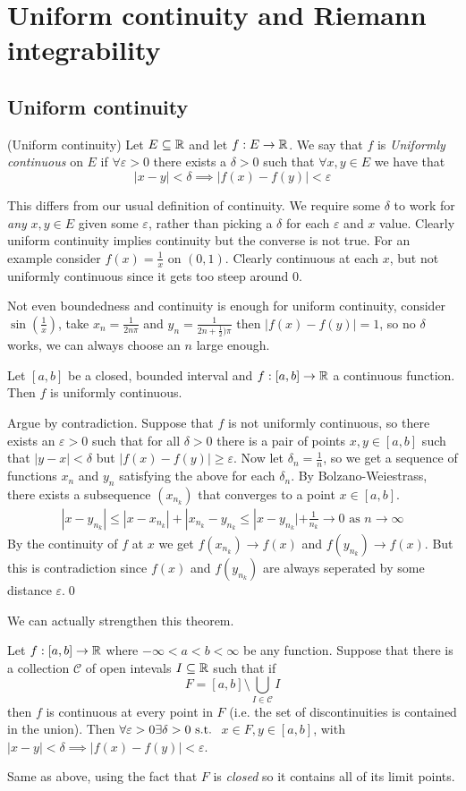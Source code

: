 \documentclass{article}
\newcommand{\eps}{\varepsilon}
\begin{document}
\section{Uniform continuity and Riemann integrability}
\subsection{Uniform continuity}
\begin{definition}
	(Uniform continuity) Let $ E\subseteq \mathbb{R} $ and let $ f:E\to \mathbb{R} $. We say that $ f $ is \textit{Uniformly continuous} on $ E $ if $ \forall \eps>0 $ there exists a $ \delta>0 $ such that $ \forall x,y\in E $ we have that
	\[
	  |x-y|<\delta\implies |f(x)-f(y)|<\eps
	\]
\end{definition}
This differs from our usual definition of continuity. We require some $ \delta $ to work for \textit{any} $ x,y\in E $ given some $ \eps $, rather than picking a $ \delta $ for each $ \eps $ and $ x $ value. Clearly uniform continuity implies continuity but the converse is not true. For an example consider $ f(x)=\frac 1x $ on $ (0,1) $. Clearly continuous at each $ x $, but not uniformly continuous since it gets too steep around $ 0 $.\par
Not even boundedness and continuity is enough for uniform continuity, consider $ \sin(\frac 1x) $, take $ x_n=\frac 1{2n\pi} $ and $ y_n=\frac 1{2n+\frac 12)\pi} $ then $ |f(x)-f(y)|=1 $, so no $ \delta $ works, we can always choose an $ n $ large enough.
\begin{theorem}
	Let $ [a,b] $ be a closed, bounded interval and $ f:[a,b]\to \mathbb{R} $ a continuous function. Then $ f $ is uniformly continuous.
\end{theorem}
\pf Argue by contradiction. Suppose that $ f $ is not uniformly continuous, so there exists an $ \eps>0 $ such that for all $ \delta>0 $ there is a pair of points $ x,y\in [a,b] $ such that $ |y-x|<\delta $ but $ |f(x)-f(y)|\ge \eps $. Now let $ \delta_n=\frac 1n $, so we get a sequence of functions $ x_n $ and $ y_n $ satisfying the above for each $ \delta_n $. By Bolzano-Weiestrass, there exists a subsequence $ (x_{n_k}) $ that converges to a point $ x\in [a,b] $.
\begin{align*}
	|x-y_{n_k}|\le |x-x_{n_k}|+|x_{n_k}-y_{n_k}\le |x-y_{n_k}|+\frac 1{n_k}\to 0\text{ as } n\to\infty 
\end{align*}
By the continuity of $ f $ at $ x $ we get $ f(x_{n_k})\to f(x) $ and $ f(y_{n_k})\to f(x) $. But this is contradiction since $ f(x) $ and $ f(y_{n_k}) $ are always seperated by some distance $ \eps $.\qed\par
We can actually strengthen this theorem.
\begin{theorem}
	Let $ f:[a,b]\to \mathbb{R} $ where $ -\infty<a<b<\infty $ be any function. Suppose that there is a collection $ \mathcal C $ of open intevals $ I\subseteq \mathbb{R} $ such that if
	\[
		F=[a,b]\setminus\bigcup_{I\in\mathcal C}I
	\]
	then $ f $ is continuous at every point in $ F $ (i.e. the set of discontinuities is contained in the union). Then $ \forall \eps>0 \exists\delta>0\st $ $ x\in F,y\in [a,b] $, with $ |x-y|<\delta \implies |f(x)-f(y)|<\eps $.
\end{theorem}
\pf Same as above, using the fact that $ F $ is \textit{closed} so it contains all of its limit points.
\end{document}
